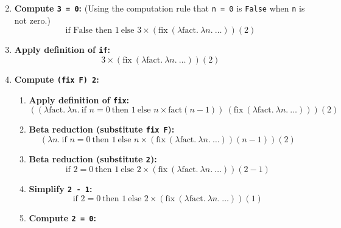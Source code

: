 \documentclass{article}
\begin{document}
\begin{enumerate}
\begin{equation*}
    \end{equation*}
    \item \textbf{Compute \texttt{3 = 0}:} (Using the computation rule that \texttt{n = 0} is \texttt{False} when \texttt{n} is not zero.)
    \begin{equation*}
    \text{if False then } 1\ \text{else } 3 \times \left( \text{fix}\ (\lambda \text{fact}.\ \lambda n.\ \ldots) \right)(2)
    \end{equation*}
    \item \textbf{Apply definition of \texttt{if}:}
    \begin{equation*}
    3 \times \left( \text{fix}\ (\lambda \text{fact}.\ \lambda n.\ \ldots) \right)(2)
    \end{equation*}
    \item \textbf{Compute \texttt{(fix F) 2}:}
    \begin{enumerate}
        \item \textbf{Apply definition of \texttt{fix}:}
        \begin{equation*}
        \left( (\lambda \text{fact}.\ \lambda n.\ \text{if } n = 0\ \text{then } 1\ \text{else } n \times \text{fact}(n - 1))\ \left( \text{fix}\ (\lambda \text{fact}.\ \lambda n.\ \ldots) \right) \right)(2)
        \end{equation*}
        \item \textbf{Beta reduction (substitute \texttt{fix F}):}
        \begin{equation*}
        \left( \lambda n.\ \text{if } n = 0\ \text{then } 1\ \text{else } n \times \left( \text{fix}\ (\lambda \text{fact}.\ \lambda n.\ \ldots) \right)(n - 1) \right)(2)
        \end{equation*}
        \item \textbf{Beta reduction (substitute \texttt{2}):}
        \begin{equation*}
        \text{if } 2 = 0\ \text{then } 1\ \text{else } 2 \times \left( \text{fix}\ (\lambda \text{fact}.\ \lambda n.\ \ldots) \right)(2 - 1)
        \end{equation*}
        \item \textbf{Simplify \texttt{2 - 1}:}
        \begin{equation*}
        \text{if } 2 = 0\ \text{then } 1\ \text{else } 2 \times \left( \text{fix}\ (\lambda \text{fact}.\ \lambda n.\ \ldots) \right)(1)
        \end{equation*}
        \item \textbf{Compute \texttt{2 = 0}:}
        \begin{equation*}

\end{equation*}
\end{enumerate}
\end{enumerate}
\end{document}
